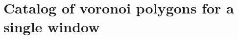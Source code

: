\documentclass[text.tex]{subfiles}
\begin{document}
\section{Catalog of voronoi polygons for a single window}
\end{document}
